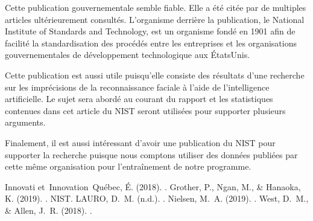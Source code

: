 \documentclass[letterpaper,10pt,french]{sphinxmanual}
\begin{document}
Cette publication gouvernementale semble fiable. Elle a été citée par de
multiples articles ultérieurement consultés. L’organisme derrière la
publication, le National Institute of Standards and Technology, est un organisme
fondé en 1901 afin de facilité la standardisation des procédés entre les
entreprises et les organisations gouvernementales de développement technologique
aux États\sphinxhyphen{}Unis.

Cette publication est aussi utile puisqu’elle consiste des résultats d’une
recherche sur les imprécisions de la reconnaissance faciale à l’aide de
l’intelligence artificielle. Le sujet sera abordé au courant du rapport et
les statistiques contenues dans cet article du NIST seront utilisées pour
supporter plusieurs arguments.

Finalement, il est aussi intéressant d’avoir une publication du NIST pour
supporter la recherche puisque nous comptons utiliser des données publiées
par cette même organisation pour l’entraînement de notre programme.



\begin{sphinxthebibliography}{Innovati}
et Innovation Québec, É. (2018). .
Grother, P., Ngan, M., \& Hanaoka, K. (2019). . NIST.
LAURO, D. M. (n.d.). .
Nielsen, M. A. (2019). .
West, D. M., \& Allen, J. R. (2018). .
\end{sphinxthebibliography}







\renewcommand{\indexname}{Index}
\printindex
\end{document}
